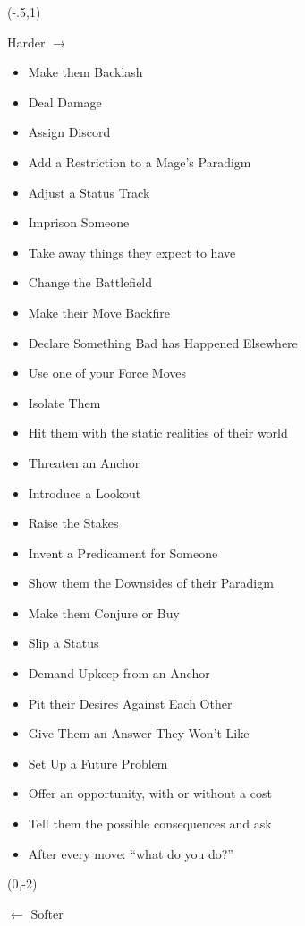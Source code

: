 \documentclass[letterpaper,10pt]{article}
\newcommand{\SECTION}[1]{\vspace{.5em}{\noindent\titlefont\LARGE\textbf{#1}}

}
\begin{document}
\begin{multicols}{2}
\SECTION{Your Moves}
\begin{textblock}{1}(-.5,1)
\begin{sideways}
\color{Gray}
{\large Harder $\rightarrow$}
\end{sideways}
\end{textblock}
\begin{itemize}
\item Make them Backlash
\item Deal Damage
\item Assign Discord
\item Add a Restriction to a Mage’s Paradigm
\item Adjust a Status Track
\item Imprison Someone
\item Take away things they expect to have
\item Change the Battlefield
\bigskip
\item Make their Move Backfire
\item Declare Something Bad has Happened Elsewhere
\item Use one of your Force Moves
\item Isolate Them
\item Hit them with the static realities of their world
\bigskip
\item Threaten an Anchor
\item Introduce a Lookout
\item Raise the Stakes
\item Invent a Predicament for Someone
\item Show them the Downsides of their Paradigm
\item Make them Conjure or Buy
\item Slip a Status
\item Demand Upkeep from an Anchor
\item Pit their Desires Against Each Other
\item Give Them an Answer They Won’t Like
\item Set Up a Future Problem
\item Offer an opportunity, with or without a cost
\item Tell them the possible consequences and ask
\item After every move: ``what do you do?''
\end{itemize}
\begin{textblock}{1}(0,-2)
\begin{sideways}
\color{Gray}
{\large $\leftarrow$ Softer}
\end{sideways}
\end{textblock}
\columnbreak


\end{multicols}
\end{document}
